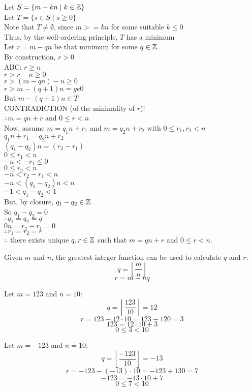 \documentclass[letterpaper,12pt,fleqn]{article}
\newcommand{\floor}[1]{\left\lfloor#1\right\rfloor}
\begin{document}
\begin{theproof}
  Let $S=\{m-kn\mid k\in\mathbb{Z}\}$ \\
  Let $T=\{s\in S\mid s\ge0\}$ \\
  Note that $T\ne\emptyset$, since $m>=kn$ for some suitable $k\le0$ \\
  Thus, by the well-ordering principle, $T$ has a minimum \\
  Let $r=m-qn$ be that minimum for some $q\in\mathbb{Z}$ \\
  By construction, $r>0$ \\
  ABC: $r\ge n$ \\
  $r>r-n\ge0$ \\
  $r>(m-qn)-n\ge0$ \\
  $r>m-(q+1)n=ge0$ \\
  But $m-(q+1)n\in T$ \\
  CONTRADICTION (of the minimality of $r$)! \\
  $\therefore m=qn+r$ and $0\le r<n$ \\

  Now, assume $m=q_1n+r_1$ and $m=q_2n+r_2$ with $0\le r_1,r_2<n$ \\
  $q_1n+r_1=q_2n+r_2$ \\
  $(q_1-q_2)n=(r_2-r_1)$ \\
  $0\le r_1<n$ \\
  $-n<-r_1\le0$ \\
  $0\le r_2<n$ \\
  $-n<r_2-r_1<n$ \\
  $-n<(q_1-q_2)n<n$ \\
  $-1<q_1-q_2<1$ \\
  But, by closure, $q_1-q_2\in\mathbb{Z}$ \\
  So $q_1-q_2=0$ \\
  $\therefore q_1=q_2=q$ \\
  $0n=r_2-r_1=0$ \\
  $\therefore r_1=r_2=r$ \\

  $\therefore$ there exists unique $q,r\in\mathbb{Z}$ such that $m=qn+r$ and
  $0\le r<n$.
\end{theproof}

Given $m$ and $n$, the greatest integer function can be used to calculate
$q$ and $r$:
\[q=\floor{\frac{m}{n}}\]
\[r=m-nq\]

\begin{example}
  Let $m=123$ and $n=10$:
  \[q=\floor{\frac{123}{10}}=12\]
  \[r=123-12\cdot10=123-120=3\]
  \[123=12\cdot10+3\]
  \[0\le3<10\]

  Let $m=-123$ and $n=10$:
  \[q=\floor{\frac{-123}{10}}=-13\]
  \[r=-123-(-13)\cdot10=-123+130=7\]
  \[-123=-13\cdot10+7\]
  \[0\le7<10\]
\end{example}
\end{document}
